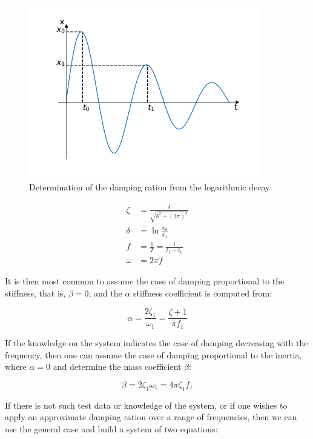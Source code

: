 \documentclass[10pt,b5paper,titlepage]{book}
\newenvironment{ematrix}
{
    \begin{eqnarray}
        \begin{aligned}
}
{
        \end{aligned}
    \end{eqnarray}
}
\begin{document}
\begin{figure}[ht]
    \centering
    \includegraphics[width=0.90\textwidth]{img/Logarithmic_Decay_Damping_Ratio.png}
    \caption{Determination of the damping ration from the logarithmic decay}
    \label{fig:logarithmic-decay-damping-ratio-png}
\end{figure}

\begin{ematrix}
    \zeta &= \frac{\delta}{\sqrt{\delta^2 + (2 \pi)^2}}\\
    \delta &= \ln{\frac{x_0}{x_1}}\\
    f &= \frac{1}{T} = \frac{1}{t_1 - t_0}\\
    \omega &= 2 \pi f
\end{ematrix}

It is then most common to assume the case of damping proportional to the stiffness,
that is, $ \beta = 0 $, and the $ \alpha $ stiffness coefficient is computed from:

\begin{equation}
    \alpha = \frac{2 \zeta_1}{\omega_1} = \frac{\zeta+1}{\pi f_1}
\end{equation}

If the knowledge on the system indicates the case of damping decreasing with the
frequency, then one can assume the case of damping proportional to the inertia,
where $ \alpha = 0 $ and determine the mass coefficient $ \beta $:

\begin{equation}
    \beta = 2 \zeta_1 \omega_1 = 4 \pi \zeta_1 f_1
\end{equation}

If there is not such test data or knowledge of the system, or if one wishes to apply
an approximate damping ration over a range of frequencies, then we can use the
general case and build a system of two equations:
\end{document}
